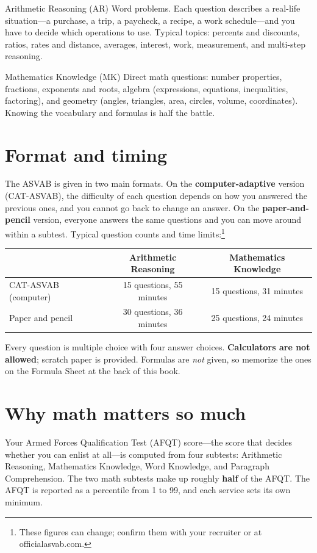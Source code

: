 \begin{concept}{Arithmetic Reasoning (AR)}
Word problems. Each question describes a real-life situation---a purchase,
a trip, a paycheck, a recipe, a work schedule---and you have to decide which
operations to use. Typical topics: percents and discounts, ratios, rates and
distance, averages, interest, work, measurement, and multi-step reasoning.
\end{concept}

\begin{concept}{Mathematics Knowledge (MK)}
Direct math questions: number properties, fractions, exponents and roots,
algebra (expressions, equations, inequalities, factoring), and geometry
(angles, triangles, area, circles, volume, coordinates). Knowing the
vocabulary and formulas is half the battle.
\end{concept}

\section*{Format and timing}
The ASVAB is given in two main formats. On the \textbf{computer-adaptive}
version (CAT-ASVAB), the difficulty of each question depends on how you
answered the previous ones, and you cannot go back to change an answer. On the
\textbf{paper-and-pencil} version, everyone answers the same questions and
you can move around within a subtest. Typical question counts and time
limits:\footnote{These figures can change; confirm them with your recruiter
or at officialasvab.com.}

\begin{center}
\renewcommand{\arraystretch}{1.25}
\begin{tabular}{lcc}
\toprule
 & \textbf{Arithmetic Reasoning} & \textbf{Mathematics Knowledge}\\
\midrule
CAT-ASVAB (computer) & 15 questions, 55 minutes & 15 questions, 31 minutes\\
Paper and pencil & 30 questions, 36 minutes & 25 questions, 24 minutes\\
\bottomrule
\end{tabular}
\end{center}

Every question is multiple choice with four answer choices. \textbf{Calculators
are not allowed}; scratch paper is provided. Formulas are \emph{not} given, so
memorize the ones on the Formula Sheet at the back of this book.

\section*{Why math matters so much}
Your Armed Forces Qualification Test (AFQT) score---the score that decides
whether you can enlist at all---is computed from four subtests: Arithmetic
Reasoning, Mathematics Knowledge, Word Knowledge, and Paragraph Comprehension.
The two math subtests make up roughly \textbf{half} of the AFQT. The AFQT is
reported as a percentile from 1 to 99, and each service sets its own minimum.


